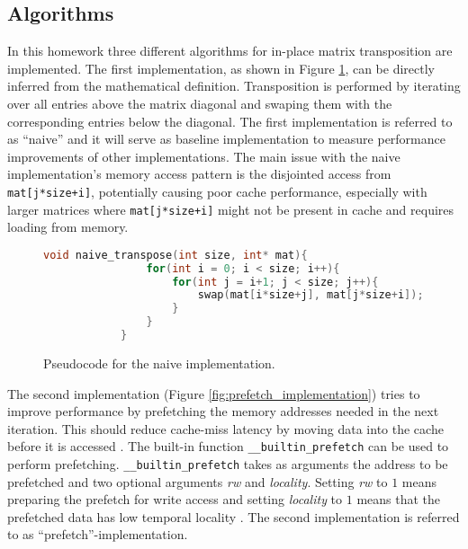 \documentclass{scrartcl}
\begin{document}
    \subsection{Algorithms}
    In this homework three different algorithms for in-place matrix transposition are implemented. The first implementation, as shown in Figure \ref{fig:naive_implementation}, can be directly inferred from the mathematical definition. Transposition is performed by iterating over all entries above the matrix diagonal and swaping them with the corresponding entries below the diagonal. The first implementation is referred to as ``naive'' and it will serve as baseline implementation to measure performance improvements of other implementations. 
    The main issue with the naive implementation's memory access pattern is the disjointed access from \lstinline{mat[j*size+i]}, potentially causing poor cache performance, especially with larger matrices where \lstinline{mat[j*size+i]} might not be present in cache and requires loading from memory.
    
    \begin{figure}
        \begin{lstlisting}[language=C]
            void naive_transpose(int size, int* mat){
                for(int i = 0; i < size; i++){
                    for(int j = i+1; j < size; j++){
                        swap(mat[i*size+j], mat[j*size+i]);
                    }
                }
            }
        \end{lstlisting}
        \caption{Pseudocode for the naive implementation.}
        \label{fig:naive_implementation}        
    \end{figure}

    The second implementation (Figure \ref{fig:prefetch_implementation}) tries to improve performance by prefetching the memory addresses needed in the next iteration. This should reduce cache-miss latency by moving data into the cache before it is accessed \cite{gccdocs}. The built-in function \lstinline{__builtin_prefetch} can be used to perform prefetching. \lstinline{__builtin_prefetch} takes as arguments the address to be prefetched and two optional arguments \textit{rw} and \textit{locality}. Setting \textit{rw} to $1$ means preparing the prefetch for write access and setting \textit{locality} to $1$ means that the prefetched data has low temporal locality \cite{gccdocs}. The second implementation is referred to as ``prefetch''-implementation.
\end{document}
